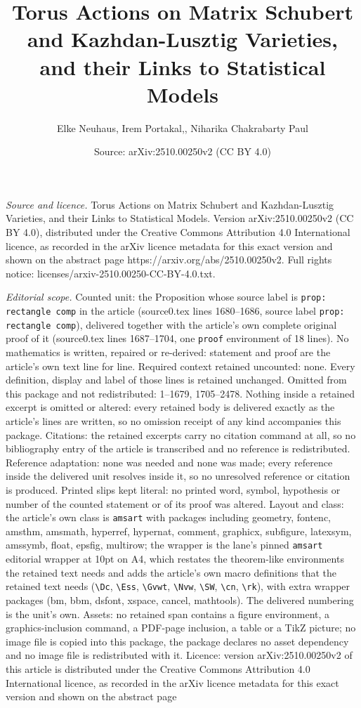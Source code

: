 \documentclass[10pt,a4paper]{amsart}
\title[Torus Actions on Matrix Schubert and Kazhdan-Lusztig Varieti]{Torus Actions on Matrix Schubert and Kazhdan-Lusztig Varieties, and their Links to Statistical Models}
\author{Elke Neuhaus, Irem Portakal,, Niharika Chakrabarty Paul}
\date{Source: arXiv:2510.00250v2 (CC BY 4.0)}
\begin{document}
\maketitle

\noindent\emph{Source and licence.} Torus Actions on Matrix Schubert and Kazhdan-Lusztig Varieties, and their Links to Statistical Models. Version arXiv:2510.00250v2 (CC BY 4.0), distributed under the Creative Commons Attribution 4.0 International licence, as recorded in the arXiv licence metadata for this exact version and shown on the abstract page https://arxiv.org/abs/2510.00250v2. Full rights notice: licenses/arxiv-2510.00250-CC-BY-4.0.txt.\par\smallskip

\noindent\textit{Editorial scope.} Counted unit: the Proposition whose source label is \texttt{prop: rectangle comp} in the article (source0.tex lines 1680--1686, source label \texttt{prop: rectangle comp}), delivered together with the article's own complete original proof of it (source0.tex lines 1687--1704, one \texttt{proof} environment of 18 lines). No mathematics is written, repaired or re-derived: statement and proof are the article's own text line for line. Required context retained uncounted: none. Every definition, display and label of those lines is retained unchanged. Omitted from this package and not redistributed: 1--1679, 1705--2478. Nothing inside a retained excerpt is omitted or altered: every retained body is delivered exactly as the article's lines are written, so no omission receipt of any kind accompanies this package. Citations: the retained excerpts carry no citation command at all, so no bibliography entry of the article is transcribed and no reference is redistributed. Reference adaptation: none was needed and none was made; every reference inside the delivered unit resolves inside it, so no unresolved reference or citation is produced. Printed slips kept literal: no printed word, symbol, hypothesis or number of the counted statement or of its proof was altered. Layout and class: the article's own class is \texttt{amsart} with packages including geometry, fontenc, amsthm, amsmath, hyperref, hypernat, comment, graphicx, subfigure, latexsym, amssymb, float, epsfig, multirow; the wrapper is the lane's pinned \texttt{amsart} editorial wrapper at 10pt on A4, which restates the theorem-like environments the retained text needs and adds the article's own macro definitions that the retained text needs (\texttt{\textbackslash Dc}, \texttt{\textbackslash Ess}, \texttt{\textbackslash Gvwt}, \texttt{\textbackslash Nvw}, \texttt{\textbackslash SW}, \texttt{\textbackslash cn}, \texttt{\textbackslash rk}), with extra wrapper packages (bm, bbm, dsfont, xspace, cancel, mathtools). The delivered numbering is the unit's own. Assets: no retained span contains a figure environment, a graphics-inclusion command, a PDF-page inclusion, a table or a TikZ picture; no image file is copied into this package, the package declares no asset dependency and no image file is redistributed with it. Licence: version arXiv:2510.00250v2 of this article is distributed under the Creative Commons Attribution 4.0 International licence, as recorded in the arXiv licence metadata for this exact version and shown on the abstract page 
\end{document}

